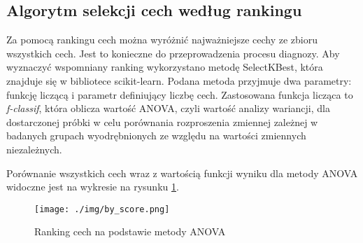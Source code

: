 \subsection{Algorytm selekcji cech według rankingu}
Za pomocą rankingu cech można wyróżnić najważniejsze cechy ze zbioru wszystkich cech. Jest to konieczne do przeprowadzenia procesu diagnozy. Aby wyznaczyć wspomniany ranking wykorzystano metodę SelectKBest, która znajduje się w bibliotece scikit-learn. Podana metoda przyjmuje dwa parametry: funkcję liczącą i parametr definiujący liczbę cech. Zastosowana funkcja licząca to \emph {f-classif}, która oblicza wartość ANOVA, czyli wartość analizy wariancji, dla dostarczonej próbki w celu porównania rozproszenia zmiennej zależnej w badanych grupach wyodrębnionych ze względu na wartości zmiennych niezależnych.




Porównanie wszystkich cech wraz z wartością funkcji wyniku dla metody ANOVA widoczne jest na wykresie na rysunku \ref{fig:by_score}.

\begin{figure}[h]
    \texttt{[image: ./img/by\_score.png]}
    \caption{Ranking cech na podstawie metody ANOVA} \label{fig:by_score}
\end{figure}

